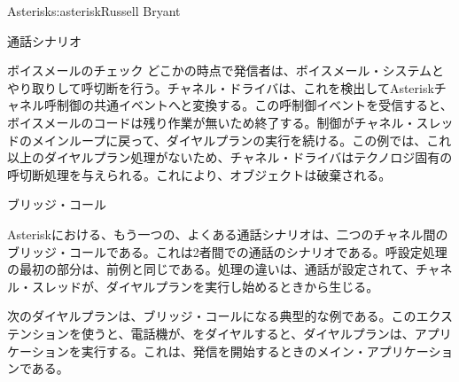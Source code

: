 \begin{aosachapter}{Asterisk}{s:asterisk}{Russell Bryant}
\begin{aosasect1}{通話シナリオ}
\begin{aosasect2}{ボイスメールのチェック}
どこかの時点で発信者は、ボイスメール・システムとやり取りして呼切断を行う。チャネル・ドライバは、これを検出してAsteriskチャネル呼制御の共通イベントへと変換する。この呼制御イベントを受信すると、ボイスメールのコードは残り作業が無いため終了する。制御がチャネル・スレッドのメインループに戻って、ダイヤルプランの実行を続ける。この例では、これ以上のダイヤルプラン処理がないため、チャネル・ドライバはテクノロジ固有の呼切断処理を与えられる。これにより、オブジェクトは破棄される。

\end{aosasect2}

\begin{aosasect2}{ブリッジ・コール}

Asteriskにおける、もう一つの、よくある通話シナリオは、二つのチャネル間のブリッジ・コールである。これは2者間での通話のシナリオである。呼設定処理の最初の部分は、前例と同じである。処理の違いは、通話が設定されて、チャネル・スレッドが、ダイヤルプランを実行し始めるときから生じる。

次のダイヤルプランは、ブリッジ・コールになる典型的な例である。このエクステンションを使うと、電話機が、をダイヤルすると、ダイヤルプランは、アプリケーションを実行する。これは、発信を開始するときのメイン・アプリケーションである。


\end{aosasect2}
\end{aosasect1}
\end{aosachapter}
